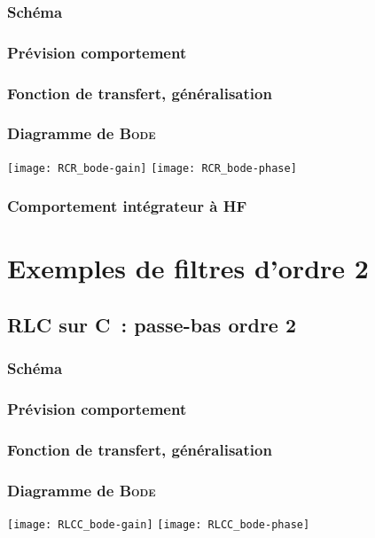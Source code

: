 \documentclass[../../main/main.tex]{subfiles}
\begin{document}
\subsubsection{Schéma}
\subsubsection{Prévision comportement}
\subsubsection{Fonction de transfert, généralisation}
\subsubsection{Diagramme de \textsc{Bode}}
\begin{center}
	\texttt{[image: RCR\_bode-gain]}
	\texttt{[image: RCR\_bode-phase]}
\end{center}
\subsubsection{Comportement intégrateur à HF}

\section{Exemples de filtres d'ordre 2}
\subsection{RLC sur C~: passe-bas ordre 2}
\subsubsection{Schéma}
\subsubsection{Prévision comportement}
\subsubsection{Fonction de transfert, généralisation}
\subsubsection{Diagramme de \textsc{Bode}}
\begin{center}
	\texttt{[image: RLCC\_bode-gain]}
	\texttt{[image: RLCC\_bode-phase]}
\end{center}
\end{document}
